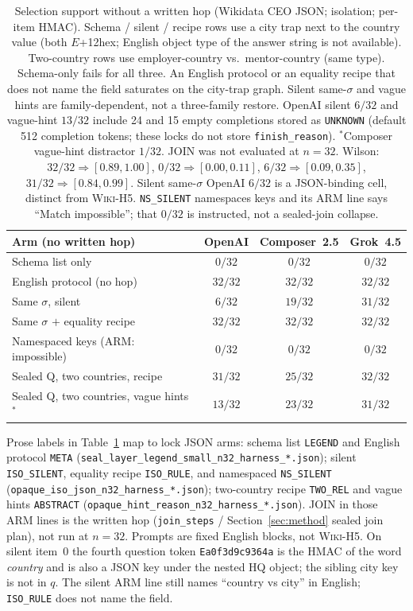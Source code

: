 \documentclass[10pt]{article} %
\begin{document}
\begin{table}[ht]
\centering
\small

\caption{Selection support without a written hop (Wikidata CEO JSON;
isolation; per-item HMAC).
Schema / silent / recipe rows use a city trap next to the country value
(both $E$+12hex; English object type of the answer string is not available).
Two-country rows use employer-country vs.\ mentor-country (same type).
Schema-only fails for all three.
An English protocol or an equality recipe that does not name the field
saturates on the city-trap graph.
Silent same-$\sigma$ and vague hints are family-dependent, not a
three-family restore.
OpenAI silent $6/32$ and vague-hint $13/32$ include 24 and 15 empty
completions stored as \texttt{UNKNOWN} (default 512 completion tokens;
these locks do not store \texttt{finish\_reason}).
$^{\ast}$Composer vague-hint distractor $1/32$. JOIN was not evaluated at
$n{=}32$. Wilson: $32/32 \Rightarrow [0.89,1.00]$,
$0/32 \Rightarrow [0.00,0.11]$,
$6/32 \Rightarrow [0.09,0.35]$,
$31/32 \Rightarrow [0.84,0.99]$.
Silent same-$\sigma$ OpenAI $6/32$ is a JSON-binding cell, distinct from
\textsc{Wiki-H5}.
\texttt{NS\_SILENT} namespaces keys and its ARM line says ``Match
impossible''; that $0/32$ is instructed, not a sealed-join collapse.}
\label{tab:ident32}
\begin{tabular}{@{}lccc@{}}
\toprule
Arm (no written hop) & OpenAI & Composer~2.5 & Grok~4.5 \\
\midrule
Schema list only & $0/32$ & $0/32$ & $0/32$ \\
English protocol (no hop) & $32/32$ & $32/32$ & $32/32$ \\
Same $\sigma$, silent & $6/32$ & $19/32$ & $31/32$ \\
Same $\sigma$ $+$ equality recipe & $32/32$ & $32/32$ & $32/32$ \\
Namespaced keys (ARM: impossible) & $0/32$ & $0/32$ & $0/32$ \\
Sealed Q, two countries, recipe & $31/32$ & $25/32$ & $32/32$ \\
Sealed Q, two countries, vague hints$^{\ast}$ & $13/32$ & $23/32$ & $31/32$ \\
\bottomrule
\end{tabular}

\end{table}

Prose labels in Table~\ref{tab:ident32} map to lock JSON arms:
schema list \texttt{LEGEND} and English protocol \texttt{META}
(\texttt{seal\_layer\_legend\_small\_n32\_harness\_*.json});
silent \texttt{ISO\_SILENT}, equality recipe \texttt{ISO\_RULE}, and
namespaced \texttt{NS\_SILENT}
(\texttt{opaque\_iso\_json\_n32\_harness\_*.json});
two-country recipe \texttt{TWO\_REL} and vague hints \texttt{ABSTRACT}
(\texttt{opaque\_hint\_reason\_n32\_harness\_*.json}).
JOIN in those ARM lines is the written hop (\texttt{join\_steps} /
Section~\ref{sec:method} sealed join plan), not run at $n{=}32$.
Prompts are fixed English blocks, not \textsc{Wiki-H5}.
On silent item~0 the fourth question token
\texttt{Ea0f3d9c9364a} is the HMAC of the word \emph{country} and is also a
JSON key under the nested HQ object; the sibling city key is not in $q$.
The silent ARM line still names ``country vs city'' in English;
\texttt{ISO\_RULE} does not name the field.
\end{document}

